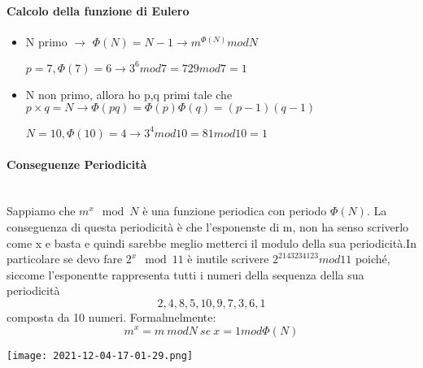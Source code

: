 \documentclass{article}
\theoremstyle{remark}
\begin{document}
\paragraph{Calcolo della funzione di Eulero}
\begin{itemize}
	\item N primo \(\rightarrow\) \(\Phi(N)=N-1\rightarrow m^{\Phi(N)}mod N\)
	      \begin{center}
		      \(p=7,\Phi(7)=6\rightarrow 3^6 mod 7=729 mod 7=1\)
	      \end{center}
	\item N non primo, allora ho p,q primi tale che \(p\times q=N\rightarrow \Phi(pq)=\Phi(p)\Phi(q)=(p-1)(q-1)\)
	      \begin{center}
		      \(N=10,\Phi(10)=4\rightarrow 3^4 mod 10 = 81 mod 10 = 1\)
	      \end{center}
\end{itemize}
\paragraph{Conseguenze Periodicità}\mbox{}\\ Sappiamo che \(m^x \mod N \) è una funzione periodica con periodo \(\Phi(N)\). La conseguenza di questa periodicità è che l'esponenste di m, non ha senso scriverlo come x e basta e quindi sarebbe meglio metterci il modulo della sua periodicità.\newline In particolare se devo fare \(2^x \mod 11\) è inutile scrivere \(2^{2143234123} mod 11\) poiché, siccome l'esponentte rappresenta tutti i numeri della sequenza della sua periodicità \[2,4,8,5,10,9,7,3,6,1\] composta da 10 numeri. Formalmelmente:\begin{equation}
	m^x=m\ mod N\ se\ x=1 mod\Phi(N)
\end{equation}
\begin{center}
	\texttt{[image: 2021-12-04-17-01-29.png]}
\end{center}
\end{document}
